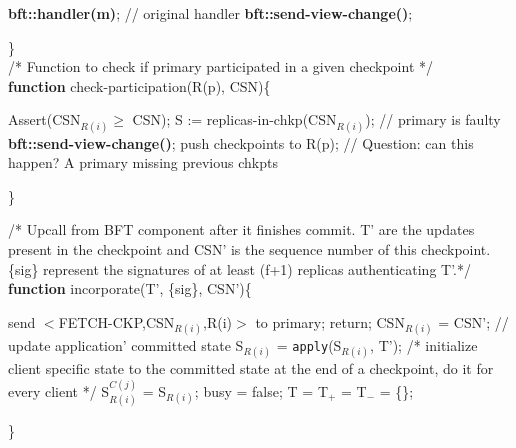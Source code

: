 \documentclass[twocolumn,10pt]{article}
\begin{document}
{\begin{algorithm}
\begin{algorithmic}[1]
\STATE \textbf{bft::handler(m)}; // original handler
\ELSE
\STATE \textbf{bft::send-view-change()};
\ENDIF
\end{algorithmic}
\}\\
/* Function to check if primary participated in a given checkpoint */\\
\textbf{function} check-participation(R(p), CSN)\{
\begin{algorithmic}
\STATE Assert(CSN$_{R(i)} \ge$ CSN);
\STATE S := replicas-in-chkp(CSN$_{R(i)}$);
\STATE // primary is faulty
\STATE \textbf{bft::send-view-change()};
\ELSE
\STATE push checkpoints to R(p);
\STATE // Question: can this happen? A primary missing previous chkpts
\ENDIF  
\end{algorithmic}
\}\\
\end{algorithm}

\begin{algorithm}
/* Upcall from BFT component after it finishes commit.
T' are the updates present in the
checkpoint and CSN' is the sequence number of this checkpoint. \{sig\}
represent the signatures of at least (f+1) replicas authenticating
T'.*/\\
\textbf{function} incorporate(T', \{sig\}, CSN')\{
\begin{algorithmic}
\STATE send $<$FETCH-CKP,CSN$_{R(i)}$,R(i)$>$ to primary;
\STATE return;
\ELSE
\STATE CSN$_{R(i)}$ = CSN';
\STATE // update application' committed state
\STATE S$_{R(i)}$ = \texttt{apply}(S$_{R(i)}$, T');
\STATE /* initialize client specific state to the committed 
state at the end of a checkpoint, do it for every client */
\STATE S$_{R(i)}^{C(j)}$ = S$_{R(i)}$;
\STATE busy = false;
\STATE T = T$_{+}$ = T$_{-}$ = \{\};
\ENDIF
\end{algorithmic}
\}\\

\end{algorithm}
}
\end{document}
